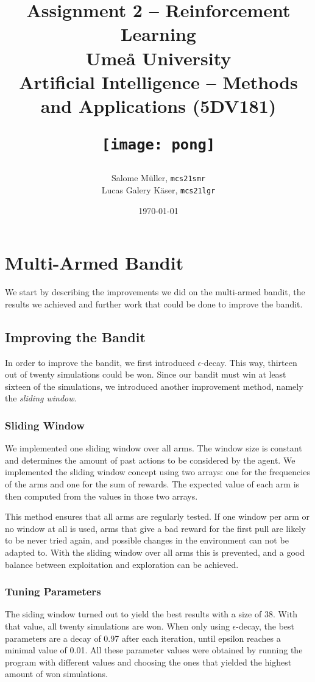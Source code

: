 \documentclass[10pt]{article}
\title{
    Assignment 2 -- Reinforcement Learning\\
    \vspace{3em}
    {\large Umeå University \\
    Artificial Intelligence -- Methods and Applications (5DV181)}
    \begin{figure}[h]
        \centering
        \texttt{[image: pong]}
    \end{figure}
    \vspace{2em}
}
\author{Salome Müller, \texttt{mcs21smr}\\ Lucas Galery Käser, \texttt{mcs21lgr}}
\date{\today}
\newcommand{\todo}[1]{{\color{red}#1}}
\begin{document}
\maketitle


\pagebreak

\section{Multi-Armed Bandit}\label{sec:mab}
We start by describing the improvements we did on the multi-armed bandit, the results we achieved and further work that could be done to improve the bandit.

\subsection{Improving the Bandit}\label{subsec:improving-the-bandit}
In order to improve the bandit, we first introduced $\epsilon$-decay.
This way, thirteen out of twenty simulations could be won.
Since our bandit must win at least sixteen of the simulations, we introduced another improvement method, namely the \textit{sliding window}.

\subsubsection{Sliding Window}
We implemented one sliding window over all arms.
The window size is constant and determines the amount of past actions to be considered by the agent.
We implemented the sliding window concept using two arrays: one for the frequencies of the arms and one for the sum of rewards.
The expected value of each arm is then computed from the values in those two arrays.

This method ensures that all arms are regularly tested.
If one window per arm or no window at all is used, arms that give a bad reward for the first pull are likely to be never tried again, and possible changes in the environment can not be adapted to.
With the sliding window over all arms this is prevented, and a good balance between exploitation and exploration can be achieved.

\subsubsection{Tuning Parameters}
The siding window turned out to yield the best results with a size of 38.
With that value, all twenty simulations are won.
When only using $\epsilon$-decay, the best parameters are a decay of 0.97 after each iteration, until epsilon reaches a minimal value of 0.01.
All these parameter values were obtained by running the program with different values and choosing the ones that yielded the highest amount of won simulations.
\end{document}
